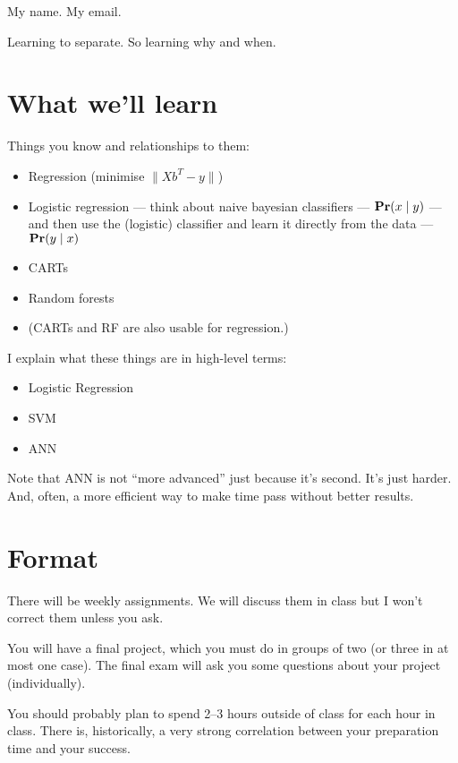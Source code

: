 




My name.  My email.

Learning to separate.  So learning why and when.

\section*{What we'll learn}

Things you know and relationships to them:
\begin{itemize}
\item Regression (minimise $\parallel Xb^T-y\parallel$)
\item Logistic regression --- think about naive bayesian classifiers
  --- $\mathbf{Pr}(x\mid y)$ --- and then use the (logistic) classifier and
  learn it directly from the data --- $\mathbf{Pr}(y\mid x)$
\item CARTs
\item Random forests
\item (CARTs and RF are also usable for regression.)
\end{itemize}

I explain what these things are in high-level terms:

\begin{itemize}
\item Logistic Regression
\item SVM
\item ANN
\end{itemize}

Note that ANN is not ``more advanced'' just because it's second.  It's
just harder.  And, often, a more efficient way to make time pass
without better results.


\section*{Format}

There will be weekly assignments.  We will discuss them in class but I
won't correct them unless you ask.

You will have a final project, which you must do in groups of two (or
three in at most one case).  The final exam will ask you some
questions about your project (individually).

You should probably plan to spend 2--3 hours outside of class for each
hour in class.  There is, historically, a very strong correlation
between your preparation time and your success.

